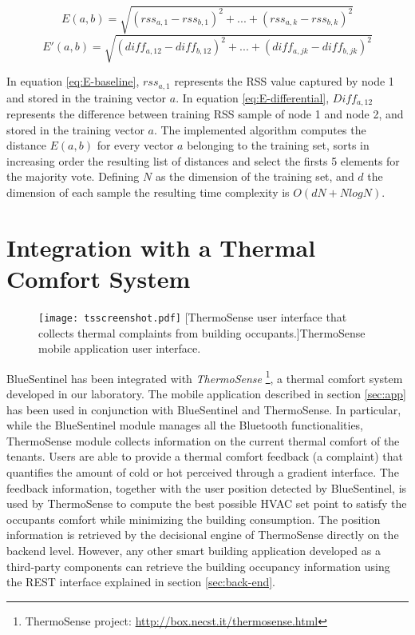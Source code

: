 \begin{equation}\label{eq:E-baseline}
E(a,b)=\sqrt{(rss_{a,1} - rss_{b,1})^2 + ... + (rss_{a,k} - rss_{b,k})^2}
\end{equation}
\begin{equation}\label{eq:E-differential}
E'(a,b)=\sqrt{(diff_{a,12} - diff_{b,12})^2 + ... + (diff_{a,jk} - diff_{b,jk})^2}
\end{equation}

In equation \ref{eq:E-baseline}, $rss_{a,1}$ represents the RSS value captured by node 1 and stored in the training vector $a$. In equation \ref{eq:E-differential}, $Diff_{a,12}$ represents the difference between training RSS sample of node 1 and node 2, and stored in the training vector $a$.
The implemented algorithm computes the distance $E(a,b)$ for every vector $a$ belonging to the training set, sorts in increasing order the resulting list of distances and select the firsts 5 elements for the majority vote. Defining $N$ as the dimension of the training set, and $d$ the dimension of each sample the resulting time complexity is $O(dN + NlogN)$.


\section{Integration with a Thermal Comfort System}
\label{sec:thermosense}

\begin{figure}[h!tb]
\center
\texttt{[image: tsscreenshot.pdf]}
[ThermoSense user interface that collects thermal complaints from building occupants.]{ThermoSense mobile application user interface.}
\label{fig:thermoUI}
\end{figure}

BlueSentinel has been integrated with \emph{ThermoSense}
\footnote{ThermoSense project: \url{http://box.necst.it/thermosense.html}}, a thermal comfort system developed in our laboratory. The mobile application described in section \ref{sec:app} has been used in conjunction with BlueSentinel and ThermoSense. In particular, while the BlueSentinel module manages all the Bluetooth functionalities, ThermoSense module collects information on the current thermal comfort of the tenants. Users are able to provide a thermal comfort feedback (a complaint) that quantifies the amount of cold or hot perceived through a gradient interface. The feedback information, together with the user position detected by BlueSentinel, is used by ThermoSense to compute the best possible HVAC set point to satisfy the occupants comfort while minimizing the building consumption.
The position information is retrieved by the decisional engine of ThermoSense directly on the backend level. However, any other smart building application developed as a third-party components can retrieve the building occupancy information using the REST interface explained in section \ref{sec:back-end}.


